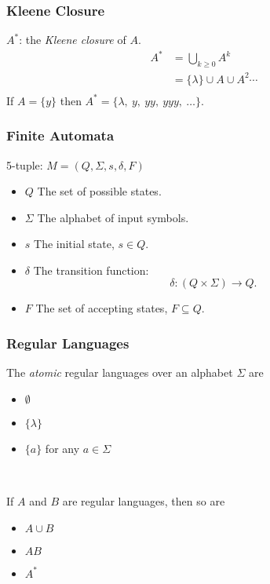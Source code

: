 \documentclass[11 pt, handout]{beamer}
\begin{document}
\begin{frame}
	\frametitle{Kleene Closure}
	$A^*$: the \textit{Kleene closure} of $A$.
	\pause
	\begin{align*}
		A^* &= \bigcup_{k \geq 0} A^k \\
		&= \{ \lambda \} \cup A \cup A^2 \cdots \\
	\end{align*}
	\pause
	If $A = \{ y \}$ then $A^* = \{ \lambda, \: y, \: yy, \: yyy, \: \dots\}$.
\end{frame}





\begin{frame}
	\frametitle{Finite Automata}

	5-tuple: $M = (Q, \Sigma, s, \delta, F)$

	\begin{itemize}
		\pause
		\item $Q$ The set of possible states.
		\pause
		\item $\Sigma$ The alphabet of input symbols.
		\pause
		\item $s$ The initial state, $s \in Q$.
		\pause
		\item $\delta$ The transition function:
		\pause
		\[
			\delta: (Q \times \Sigma) \to Q.
		\]
		\pause
		\item $F$ The set of accepting states, $F \subseteq Q$.
	\end{itemize}
\end{frame}

\begin{frame}
	\frametitle{Regular Languages}

	The \textit{atomic} regular languages over an alphabet $\Sigma$ are
	\begin{itemize}
		\pause
		\item $\emptyset$
		\pause
		\item $\{ \lambda \}$
		\pause
		\item $\{ a \}$ for any $a \in \Sigma$ 
	\end{itemize}~\\[1 em]
	\pause

	If $A$ and $B$ are regular languages, then so are
	\begin{itemize}
		\pause
		\item $A \cup B$
		\pause
		\item $AB$
		\pause
		\item $A^*$
	\end{itemize}
\end{frame}
\end{document}
